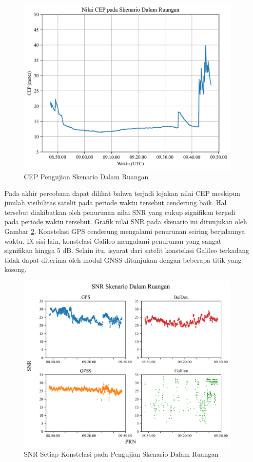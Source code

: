 \begin{figure}[H]
	\centering
	\includegraphics[width=13cm]{contents/chapter-4/2-skenario-indoor/cep.png}
	\caption{CEP Pengujian Skenario Dalam Ruangan}
	\label{Fig: indoor-cep}
\end{figure}

Pada akhir percobaan dapat dilihat bahwa terjadi lojakan nilai CEP meskipun jumlah visibilitas satelit pada periode waktu tersebut cenderung baik. Hal tersebut diakibatkan oleh penurunan nilai SNR yang cukup signifikan terjadi pada periode waktu tersebut. Grafik nilai SNR pada skenario ini ditunjukan oleh Gambar \ref{Fig: indoor-snr}. Konstelasi GPS cenderung mengalami penurunan seiring berjalannya waktu. Di sisi lain, konstelasi Galileo mengalami penurunan yang sangat signifikan hingga 5 dB. Selain itu, isyarat dari satelit konstelasi Galileo terkadang tidak dapat diterima oleh modul GNSS ditunjukan dengan beberapa titik yang kosong.

\begin{figure}[H]
	\centering
	\includegraphics[width=13cm]{contents/chapter-4/2-skenario-indoor/snr.png}
	\caption{SNR Setiap Konstelasi pada Pengujian Skenario Dalam Ruangan}
	\label{Fig: indoor-snr}
\end{figure}


